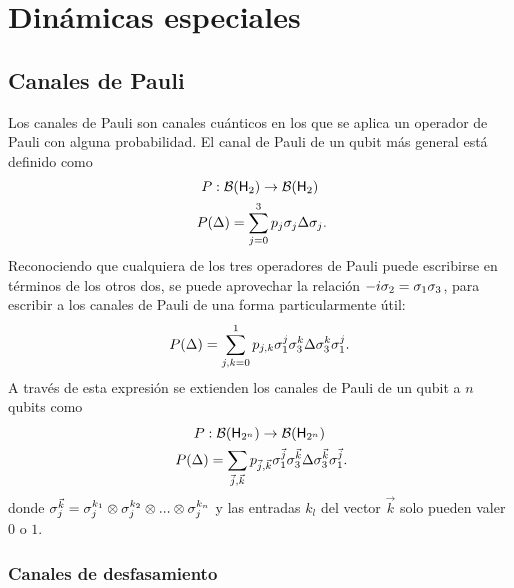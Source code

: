 \section{Dinámicas especiales}

\subsection{Canales de Pauli}


Los canales de Pauli son canales cuánticos en los que se aplica un operador de Pauli con alguna probabilidad. El canal de Pauli de un qubit más general está definido como
\begin{gather}
    P:\mcB(\hilbert_{2}) \rightarrow \mcB(\hilbert_{2})\nonumber\\
    P(\Delta)=\sum_{j=0}^{3}p_{j}\pauli{j}\Delta\pauli{j}\rlap{.}\nonumber
\end{gather}
Reconociendo que cualquiera de los tres operadores de Pauli puede escribirse en términos de los otros dos, se puede aprovechar la relación $-i\sigma_{2}=\sigma_{1}\sigma_{3}$, para escribir a los canales de Pauli de una forma particularmente útil:
\begin{equation}
    P(\Delta)=\sum_{j,k=0}^{1}p_{j,k}\sigma_{1}^{j}\sigma_{3}^{k}\Delta\sigma_{3}^{k}\sigma_{1}^{j}.\nonumber
\end{equation}
A través de esta expresión se extienden los canales de Pauli de un qubit a $n$ qubits como
\begin{gather}
    P:\mcB(\hilbert_{2^{n}}) \rightarrow \mcB(\hilbert_{2^{n}})\nonumber\\
    P(\Delta)=\sum_{\vec{j},\vec{k}}p_{\vec{j},\vec{k}}\pauli{1}^{\vec{j}}\pauli{3}^{\vec{k}}\Delta\pauli{3}^{\vec{k}}\pauli{1}^{\vec{j}}\rlap{.}\nonumber
\end{gather}
donde $\sigma_{j}^{\vec{k}}=\sigma_{j}^{k_{1}}\otimes\sigma_{j}^{k_{2}}\otimes ... \otimes \sigma_{j}^{k_{n}}$ y las entradas $k_{l}$ del vector $\vec{k}$ solo pueden valer $0$ o $1$.

\subsubsection{Canales de desfasamiento}

